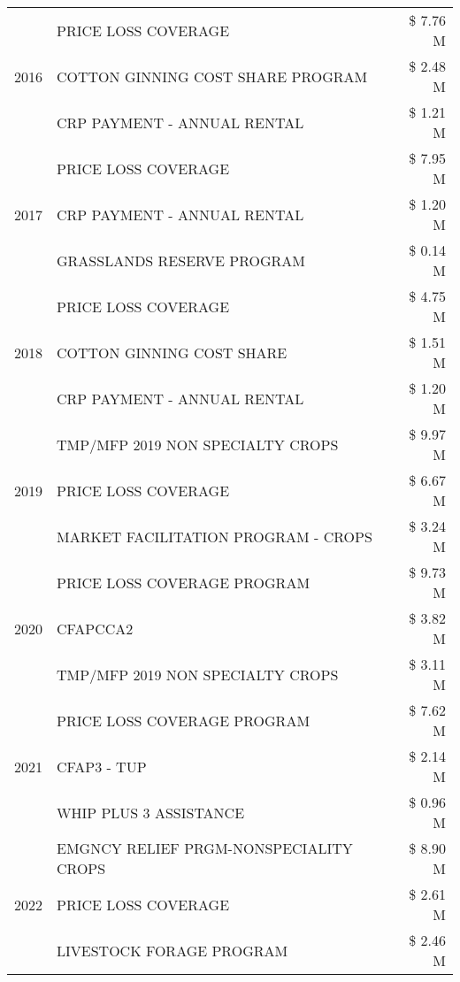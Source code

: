 \begin{tabular}{llr}
\cline{1-3}
\multirow[t]{3}{*}{2016} & PRICE LOSS COVERAGE & \$ 7.76 M \\
 & COTTON GINNING COST SHARE PROGRAM & \$ 2.48 M \\
 & CRP PAYMENT - ANNUAL RENTAL & \$ 1.21 M \\
\cline{1-3}
\multirow[t]{3}{*}{2017} & PRICE LOSS COVERAGE & \$ 7.95 M \\
 & CRP PAYMENT - ANNUAL RENTAL & \$ 1.20 M \\
 & GRASSLANDS RESERVE PROGRAM & \$ 0.14 M \\
\cline{1-3}
\multirow[t]{3}{*}{2018} & PRICE LOSS COVERAGE & \$ 4.75 M \\
 & COTTON GINNING COST SHARE & \$ 1.51 M \\
 & CRP PAYMENT - ANNUAL RENTAL & \$ 1.20 M \\
\cline{1-3}
\multirow[t]{3}{*}{2019} & TMP/MFP 2019 NON SPECIALTY CROPS & \$ 9.97 M \\
 & PRICE LOSS COVERAGE & \$ 6.67 M \\
 & MARKET FACILITATION PROGRAM - CROPS & \$ 3.24 M \\
\cline{1-3}
\multirow[t]{3}{*}{2020} & PRICE LOSS COVERAGE PROGRAM & \$ 9.73 M \\
 & CFAPCCA2 & \$ 3.82 M \\
 & TMP/MFP 2019 NON SPECIALTY CROPS & \$ 3.11 M \\
\cline{1-3}
\multirow[t]{3}{*}{2021} & PRICE LOSS COVERAGE PROGRAM & \$ 7.62 M \\
 & CFAP3 - TUP & \$ 2.14 M \\
 & WHIP PLUS 3 ASSISTANCE & \$ 0.96 M \\
\cline{1-3}
\multirow[t]{3}{*}{2022} & EMGNCY RELIEF PRGM-NONSPECIALITY CROPS & \$ 8.90 M \\
 & PRICE LOSS COVERAGE & \$ 2.61 M \\
 & LIVESTOCK FORAGE PROGRAM & \$ 2.46 M \\
\cline{1-3}
\bottomrule
\end{tabular}
